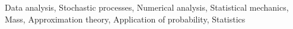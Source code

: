 \documentclass[]{article}
\begin{document}
Data analysis, Stochastic processes, Numerical analysis, Statistical mechanics, Mass, Approximation theory, Application of probability, Statistics
\end{document}
